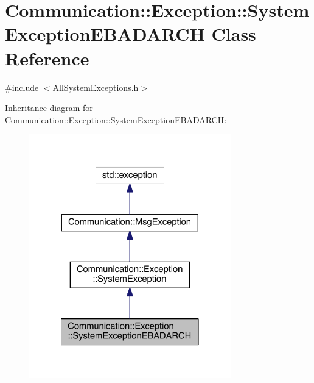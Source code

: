\hypertarget{class_communication_1_1_exception_1_1_system_exception_e_b_a_d_a_r_c_h}{}\section{Communication\+:\+:Exception\+:\+:System\+Exception\+E\+B\+A\+D\+A\+R\+C\+H Class Reference}
\label{class_communication_1_1_exception_1_1_system_exception_e_b_a_d_a_r_c_h}


{\ttfamily \#include $<$All\+System\+Exceptions.\+h$>$}



Inheritance diagram for Communication\+:\+:Exception\+:\+:System\+Exception\+E\+B\+A\+D\+A\+R\+C\+H\+:\nopagebreak
\begin{figure}[H]
\begin{center}
\leavevmode
\includegraphics[width=248pt]{class_communication_1_1_exception_1_1_system_exception_e_b_a_d_a_r_c_h__inherit__graph}
\end{center}
\end{figure}


